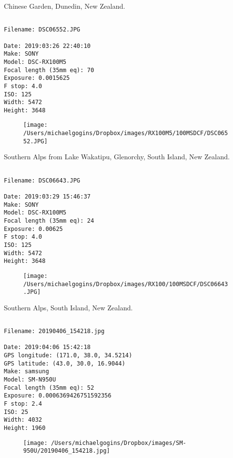 \documentclass[11pt,letter,DIV=14,paper=landscape]{scrbook}
\begin{document}
\clearpage
\noindent Chinese Garden, Dunedin, New Zealand.
\noindent
\begin{lstlisting}

Filename: DSC06552.JPG

Date: 2019:03:26 22:40:10
Make: SONY
Model: DSC-RX100M5
Focal length (35mm eq): 70
Exposure: 0.0015625
F stop: 4.0
ISO: 125
Width: 5472
Height: 3648
\end{lstlisting}
\clearpage

\begin{figure}
\texttt{[image: /Users/michaelgogins/Dropbox/images/RX100M5/100MSDCF/DSC06552.JPG]}
\end{figure}
    
\clearpage
\noindent Southern Alps from Lake Wakatipu, Glenorchy, South Island, New Zealand.
\noindent
\begin{lstlisting}

Filename: DSC06643.JPG

Date: 2019:03:29 15:46:37
Make: SONY
Model: DSC-RX100M5
Focal length (35mm eq): 24
Exposure: 0.00625
F stop: 4.0
ISO: 125
Width: 5472
Height: 3648
\end{lstlisting}
\clearpage

\begin{figure}
\texttt{[image: /Users/michaelgogins/Dropbox/images/RX100/100MSDCF/DSC06643.JPG]}
\end{figure}
    
\clearpage
\noindent Southern Alps, South Island, New Zealand.
\noindent
\begin{lstlisting}

Filename: 20190406_154218.jpg

Date: 2019:04:06 15:42:18
GPS longitude: (171.0, 38.0, 34.5214)
GPS latitude: (43.0, 30.0, 16.9044)
Make: samsung
Model: SM-N950U
Focal length (35mm eq): 52
Exposure: 0.0006369426751592356
F stop: 2.4
ISO: 25
Width: 4032
Height: 1960
\end{lstlisting}
\clearpage

\begin{figure}
\texttt{[image: /Users/michaelgogins/Dropbox/images/SM-950U/20190406\_154218.jpg]}
\end{figure}
    
\end{document}

